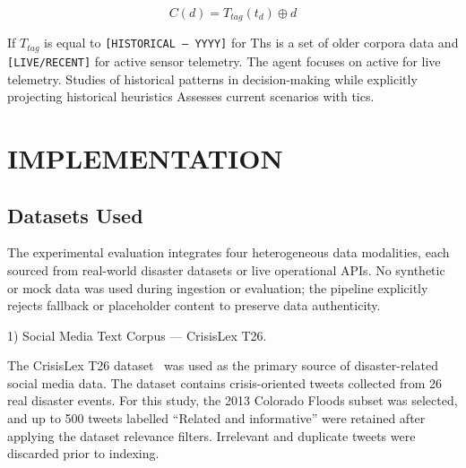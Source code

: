 \documentclass[conference]{IEEEtran}
\begin{document}
\begin{equation}
C(d) = T_{tag}(t_d) \oplus d
\end{equation}

If $T_{tag}$ is equal to \texttt{[HISTORICAL — YYYY]} for Ths is a set of older corpora data and \texttt{[LIVE/RECENT]} for active sensor telemetry. The agent focuses on active for live telemetry. Studies of historical patterns in decision-making while explicitly projecting historical heuristics Assesses current scenarios with tics.





\section{IMPLEMENTATION}

\subsection{Datasets Used}

The experimental evaluation integrates four heterogeneous data modalities, each sourced
from real-world disaster datasets or live operational APIs. No synthetic or mock data
was used during ingestion or evaluation; the pipeline explicitly rejects fallback or
placeholder content to preserve data authenticity.

1) Social Media Text Corpus --- CrisisLex T26.

The CrisisLex T26 dataset~\cite{b21} was used as the primary source of disaster-related
social media data. The dataset contains crisis-oriented tweets collected from 26 real
disaster events. For this study, the 2013 Colorado Floods subset was selected, and
up to 500 tweets labelled ``Related and informative'' were retained after applying
the dataset relevance filters. Irrelevant and duplicate tweets were discarded prior
to indexing.
\end{document}
